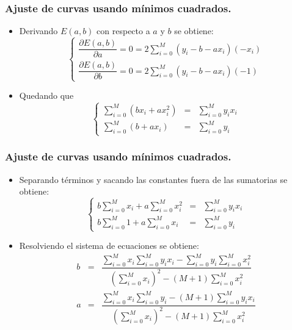 \documentclass[10pt]{beamer}
\begin{document}
\frame
{
\frametitle{Ajuste de curvas usando m\'inimos cuadrados.}
\begin{itemize}
\item<1-> Derivando $E(a,b)$ con respecto a $a$ y $b$ se obtiene:
$$
\left\{\begin{array}{l}
        \dfrac{\partial E(a,b)}{\partial a} = 0 = 2\displaystyle\sum_{i=0}^M(y_i - b - ax_i)(-x_i)\\
        \dfrac{\partial E(a,b)}{\partial b} = 0 = 2\displaystyle\sum_{i=0}^M(y_i - b - ax_i)(-1)
       \end{array}\right.
$$
\item<2-> Quedando que
$$
\left\{\begin{array}{lrl}
  \displaystyle\sum_{i=0}^M(bx_i+ax_i^2) & = & \displaystyle\sum_{i=0}^My_ix_i\\
  \displaystyle \sum_{i=0}^M(b+ax_i) & = & \displaystyle\sum_{i=0}^My_i
 \end{array}\right.
$$
\end{itemize}
}
\frame
{
\frametitle{Ajuste de curvas usando m\'inimos cuadrados.}
\begin{itemize}
\item<1-> Separando t\'erminos y sacando las constantes fuera de las sumatorias se obtiene:
$$
\left\{\begin{array}{lrl}
  b\displaystyle\sum_{i=0}^Mx_i + a\displaystyle\sum_{i=0}^Mx_i^2 & = & \displaystyle\sum_{i=0}^My_ix_i\\
  b\displaystyle\sum_{i=0}^M1 + a\displaystyle\sum_{i=0}^Mx_i & = & \displaystyle\sum_{i=0}^My_i
 \end{array}\right.
$$
\item<2-> Resolviendo el sistema de ecuaciones se obtiene:
$$
\begin{array}{rcl}
b  & = & \dfrac{\displaystyle\sum_{i=0}^Mx_i\displaystyle\sum_{i=0}^My_ix_i
-\displaystyle\sum_{i=0}^My_i\displaystyle\sum_{i=0}^Mx_i^2 }{\left(\displaystyle\sum_{i=0}^Mx_i\right)^2
-(M+1)\displaystyle\sum_{i=0}^Mx_i^2}\\
 a & = & \dfrac{\displaystyle\sum_{i=0}^Mx_i\displaystyle\sum_{i=0}^My_i
-(M+1)\displaystyle\sum_{i=0}^My_ix_i}{\left(\displaystyle\sum_{i=0}^Mx_i\right)^2
-(M+1)\displaystyle\sum_{i=0}^Mx_i^2}
\end{array}
$$
\end{itemize}
}
\frame
\end{document}
